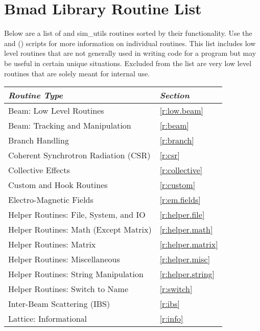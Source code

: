 \chapter{Bmad Library Routine List}

Below are a list of \bmad and sim_utils routines sorted by their
functionality.  Use the  and  ()
scripts for more information on individual routines.
This list includes low level routines that are not generally used in
writing code for a program but may be useful in certain unique
situations.  Excluded from the list are very low level routines that are
solely meant for \bmad internal use.

\toffset
\begin{center}
\begin{tabular}{ll} \toprule
{\em Routine Type} & {\em Section} \\ \midrule
  Beam: Low Level Routines                    & \ref{r:low.beam}       \\
  Beam: Tracking and Manipulation             & \ref{r:beam}           \\
  Branch Handling                             & \ref{r:branch}         \\
  Coherent Synchrotron Radiation (CSR)        & \ref{r:csr}            \\
  Collective Effects                          & \ref{r:collective}     \\
  Custom and Hook Routines                    & \ref{r:custom}         \\
  Electro-Magnetic Fields                     & \ref{r:em.fields}      \\
  Helper Routines: File, System, and IO       & \ref{r:helper.file}    \\
  Helper Routines: Math (Except Matrix)       & \ref{r:helper.math}    \\
  Helper Routines: Matrix                     & \ref{r:helper.matrix}  \\
  Helper Routines: Miscellaneous              & \ref{r:helper.misc}    \\
  Helper Routines: String Manipulation        & \ref{r:helper.string}  \\
  Helper Routines: Switch to Name             & \ref{r:switch}         \\
  Inter-Beam Scattering (IBS)                 & \ref{r:ibs}            \\
  Lattice: Informational                      & \ref{r:info}           \\

\end{tabular}
\end{center}
